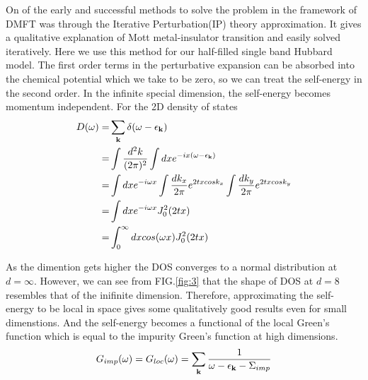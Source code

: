 \documentclass[aps,prl,twocolumn,showpacs,floatfix,superscriptaddress]{revtex4-1}
\begin{document}
On of the early and successful methods to solve the problem in the framework of DMFT was through the Iterative Perturbation(IP) theory approximation\cite{georges92}. It gives a qualitative explanation of Mott metal-insulator transition and easily solved iteratively. Here we use this method for our half-filled single band Hubbard model. The first order terms in the perturbative expansion can be absorbed into the chemical potential which we take to be zero\cite{georges}, so we can treat the self-energy in the second order.
In the infinite special dimension, the self-energy becomes momentum independent.
For the 2D density of states
\begin{align}
D(\omega) =& \sum_{\textbf{k}}\delta(\omega - \epsilon_{\textbf k})\nonumber\\ 
	  =& \int \frac{d^2 k}{(2\pi)^2}\int dx e^{-ix(\omega -\epsilon_{\textbf{k}})}\nonumber \\
	  =& \int dx e^{-i\omega x}\int \frac{dk_x}{2\pi}e^{2txcosk_x}\int \frac{dk_y}{2\pi}e^{2txcosk_y}\nonumber\\
	  =& \int dx e^{-i\omega x}J_0^2(2t x)\nonumber \\
	  =& \int_0^{\infty} dx cos(\omega x)J_0^2(2t x)\nonumber\\
\end{align}

As the dimention gets higher the DOS converges to a normal distribution at $d = \infty$. However, we can see from FIG.\ref{fig:3} that the shape of DOS at $d = 8$ resembles that of the inifinite dimension. Therefore, approximating the self-energy to be local in space gives some qualitatively good results even for small dimenstions. And the self-energy becomes a functional of the local Green's function which is equal to the impurity Green's function at high dimensions. 
\begin{align}
G_{imp}(\omega) = G_{loc}(\omega) = \sum_{\textbf k}\frac{1}{\omega - \epsilon_{\textbf k}- \Sigma_{imp}}
\end{align}
\end{document}
